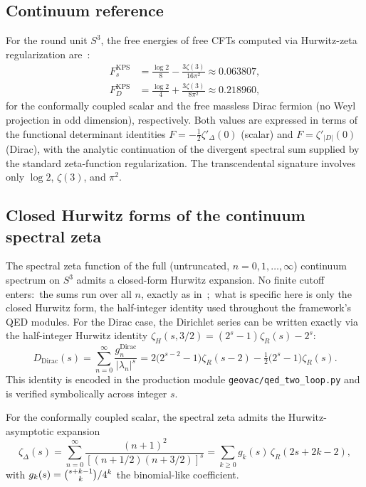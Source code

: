 \documentclass[11pt,a4paper]{article}
\theoremstyle{plain}
\theoremstyle{definition}
\newcommand{\sthree}{S^{3}}
\newcommand{\KPS}{\text{KPS}}
\begin{document}
\subsection{Continuum reference}

For the round unit $\sthree$, the free energies of free CFTs computed
via Hurwitz-zeta regularization
are~\cite{klebanov_pufu_safdi2011}:
\begin{align}
F_{s}^{\KPS} &= \frac{\log 2}{8} - \frac{3\zeta(3)}{16\pi^{2}}
\approx 0.063807, \label{eq:Fs_KPS}\\
F_{D}^{\KPS} &= \frac{\log 2}{4} + \frac{3\zeta(3)}{8\pi^{2}}
\approx 0.218960, \label{eq:FD_KPS}
\end{align}
for the conformally coupled scalar and the free massless
Dirac fermion (no Weyl projection in odd dimension), respectively. Both values are expressed in terms of the
functional determinant identities $F = -\tfrac{1}{2}\zeta'_{\Delta}(0)$
(scalar) and $F = \zeta'_{|D|}(0)$ (Dirac), with the analytic
continuation of the divergent spectral sum supplied by the standard
zeta-function regularization. The transcendental signature involves
only $\log 2$, $\zeta(3)$, and $\pi^{2}$.

\subsection{Closed Hurwitz forms of the continuum spectral zeta}

The spectral zeta function of the full (untruncated,
$n = 0, 1, \dots, \infty$) continuum spectrum on $\sthree$ admits a
closed-form Hurwitz expansion. No finite cutoff enters:\ the sums run
over all $n$, exactly as in~\cite{klebanov_pufu_safdi2011};\ what is
specific here is only the closed Hurwitz form, the half-integer
identity used throughout the framework's QED modules. For the Dirac case, the Dirichlet
series can be written exactly via the half-integer Hurwitz identity
$\zeta_{H}(s, 3/2) = (2^{s} - 1)\zeta_{R}(s) - 2^{s}$:
\begin{equation}
D_{\mathrm{Dirac}}(s) = \sum_{n = 0}^{\infty} \frac{g_{n}^{\mathrm{Dirac}}}{|\lambda_{n}|^{s}}
= 2\bigl(2^{s - 2} - 1\bigr) \zeta_{R}(s - 2) - \tfrac{1}{2}\bigl(2^{s} - 1\bigr) \zeta_{R}(s).
\label{eq:DDirac_closed_form}
\end{equation}
This identity is encoded in the production module
\texttt{geovac/qed\_two\_loop.py} and is verified symbolically across
integer $s$.

For the conformally coupled scalar, the spectral zeta admits the
Hurwitz-asymptotic expansion
\begin{equation}
\zeta_{\Delta}(s) = \sum_{n = 0}^{\infty} \frac{(n + 1)^{2}}{[(n + 1/2)(n + 3/2)]^{s}}
= \sum_{k \ge 0} g_{k}(s)\, \zeta_{R}(2s + 2k - 2),
\label{eq:zeta_scalar_expansion}
\end{equation}
with $g_{k}(s) = \tbinom{s + k - 1}{k} / 4^{k}$ the
binomial-like coefficient.
\end{document}
